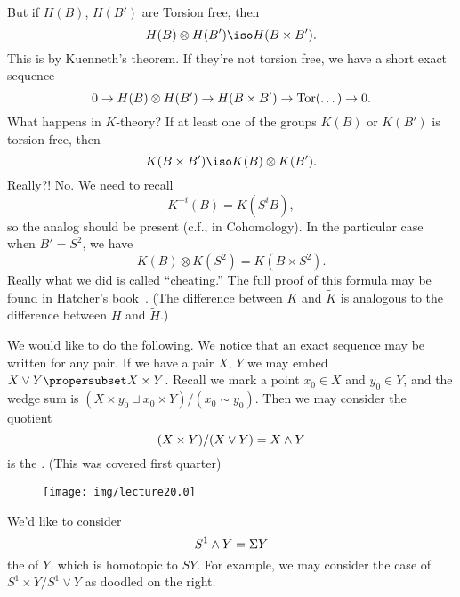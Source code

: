 But if $H(B)$, $H(B')$ are Torsion free, then
\begin{equation}
H(B)\otimes H(B')\iso H(B\times B').
\end{equation}
This is by Kuenneth's theorem. If they're not torsion free, we
have a short exact sequence
\begin{equation}
0\to H(B)\otimes H(B')\to H(B\times B')\to \mathop{\mathrm{Tor}}\nolimits(\dots)\to 0.
\end{equation}
What happens in $K$-theory? If at least one of the groups $K(B)$
or $K(B')$ is torsion-free, then
\begin{equation}
K(B\times B')\iso K(B)\otimes K(B').
\end{equation}
Really?! No. We need to recall
\begin{equation}
K^{-i}(B)=K(S^{i}B),
\end{equation}
so the analog should be present (c.f., in Cohomology). In the
particular case when $B'=S^2$, we have
\begin{equation}
K(B)\otimes K(S^{2})=K(B\times S^{2}).
\end{equation}
Really what we did is called ``cheating.'' The full proof of this
formula may be found in Hatcher's
book~\cite[\S2.1]{hatcher2009vector}. (The difference between $K$ and
$\widetilde{K}$ is analogous to the difference between $H$ and $\widetilde{H}$.)

We would like to do the following. We notice that an exact
sequence may be written for any pair. If we have a pair $X$, $Y$
we may embed $X\vee Y\propersubset X\times Y$. Recall we mark a
point $x_0\in X$ and $y_0\in Y$, and the wedge sum is $(X\times
y_0\sqcup x_0\times Y)/(x_0\sim y_0)$. Then we may consider the quotient
\begin{equation}
(X\times Y)/(X\vee Y)=X\wedge Y
\end{equation}
is the . (This was covered first quarter)

\begin{wrapfigure}{r}{1.74in}
  \vspace{-30pt}
  \texttt{[image: img/lecture20.0]}
\end{wrapfigure}
\noindent{}We'd like to consider
\begin{equation}
S^{1}\wedge Y=\Sigma Y
\end{equation}
the  of $Y$, which is homotopic to $SY$. 
For example, we may consider the case of $S^{1}\times Y/S^{1}\vee
Y$ as doodled on the right.

